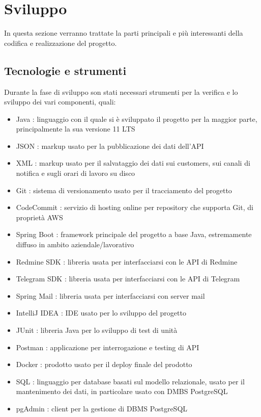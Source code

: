     
    
    
\section{Sviluppo}
	In questa sezione verranno trattate la parti principali e più interessanti della codifica e realizzazione del progetto.
	\subsection{Tecnologie e strumenti}
		Durante la fase di sviluppo son stati necessari strumenti per la verifica e lo sviluppo dei vari componenti, quali:
		\begin{itemize}
			\item Java : linguaggio con il quale si è sviluppato il progetto per la maggior parte, principalmente la sua versione 11 LTS
			\item JSON : markup usato per la pubblicazione dei dati dell'API
			\item XML : markup usato per il salvataggio dei dati sui customers, sui canali di notifica e sugli orari di lavoro su disco
			\item Git : sistema di versionamento usato per il tracciamento del progetto
			\item CodeCommit : servizio di hosting online per repository che supporta Git, di proprietà AWS
			\item Spring Boot : framework principale del progetto a base Java, estremamente diffuso in ambito aziendale/lavorativo
			\item Redmine SDK : libreria usata per interfacciarsi con le API di Redmine
			\item Telegram SDK : libreria usata per interfacciarsi con le API di Telegram
			\item Spring Mail : libreria usata per interfacciarsi con server mail
			\item IntelliJ IDEA : IDE usato per lo sviluppo del progetto
			\item JUnit : libreria Java per lo sviluppo di test di unità
			\item Postman : applicazione per interrogazione e testing di API
			\item Docker : prodotto usato per il deploy finale del prodotto
			\item SQL : linguaggio per database basati sul modello relazionale, usato per il mantenimento dei dati, in particolare usato con DMBS  PostgreSQL
			\item pgAdmin : client per la gestione di DBMS PostgreSQL
		\end{itemize}
